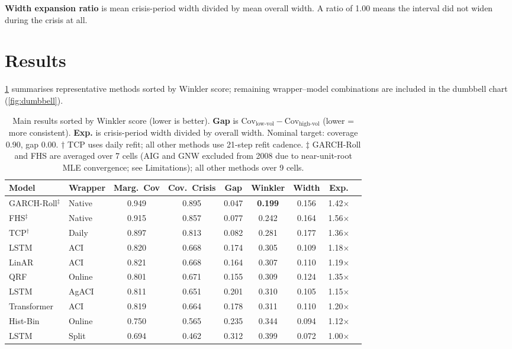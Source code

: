 \documentclass{article}
\begin{document}
\textbf{Width expansion ratio} is mean crisis-period width divided by mean overall width. A ratio of 1.00 means the interval did not widen during the crisis at all.


\section{Results}

\cref{tab:main} summarises representative methods sorted by Winkler score; remaining wrapper--model combinations are included in the dumbbell chart (\cref{fig:dumbbell}).

\begin{table}[t]
\caption{Main results sorted by Winkler score (lower is better). \textbf{Gap} is $\text{Cov}_{\text{low-vol}} - \text{Cov}_{\text{high-vol}}$ (lower = more consistent). \textbf{Exp.} is crisis-period width divided by overall width. Nominal target: coverage 0.90, gap 0.00. $\dagger$ TCP uses daily refit; all other methods use 21-step refit cadence. $\ddagger$ GARCH-Roll and FHS are averaged over 7 cells (AIG and GNW excluded from 2008 due to near-unit-root MLE convergence; see Limitations); all other methods over 9 cells.}
\label{tab:main}
\centering
\small
\setlength{\tabcolsep}{5pt}
\begin{tabular}{llccccccc}
\toprule
Model & Wrapper & Marg.\ Cov & Cov.\ Crisis & Gap & Winkler & Width & Exp. \\
\midrule
GARCH-Roll$^\ddagger$ & Native & 0.949 & 0.895 & 0.047 & \textbf{0.199} & 0.156 & 1.42$\times$ \\
FHS$^\ddagger$        & Native & 0.915 & 0.857 & 0.077 & 0.242 & 0.164 & 1.56$\times$ \\
TCP$^\dagger$ & Daily  & 0.897 & 0.813 & 0.082 & 0.281 & 0.177 & 1.36$\times$ \\
\midrule
LSTM       & ACI    & 0.820 & 0.668 & 0.174 & 0.305 & 0.109 & 1.18$\times$ \\
LinAR      & ACI    & 0.821 & 0.668 & 0.164 & 0.307 & 0.110 & 1.19$\times$ \\
QRF        & Online & 0.801 & 0.671 & 0.155 & 0.309 & 0.124 & 1.35$\times$ \\
LSTM       & AgACI  & 0.811 & 0.651 & 0.201 & 0.310 & 0.105 & 1.15$\times$ \\
Transformer & ACI   & 0.819 & 0.664 & 0.178 & 0.311 & 0.110 & 1.20$\times$ \\
Hist-Bin   & Online & 0.750 & 0.565 & 0.235 & 0.344 & 0.094 & 1.12$\times$ \\
LSTM       & Split  & 0.694 & 0.462 & 0.312 & 0.399 & 0.072 & 1.00$\times$ \\
\bottomrule
\end{tabular}
\end{table}
\end{document}

